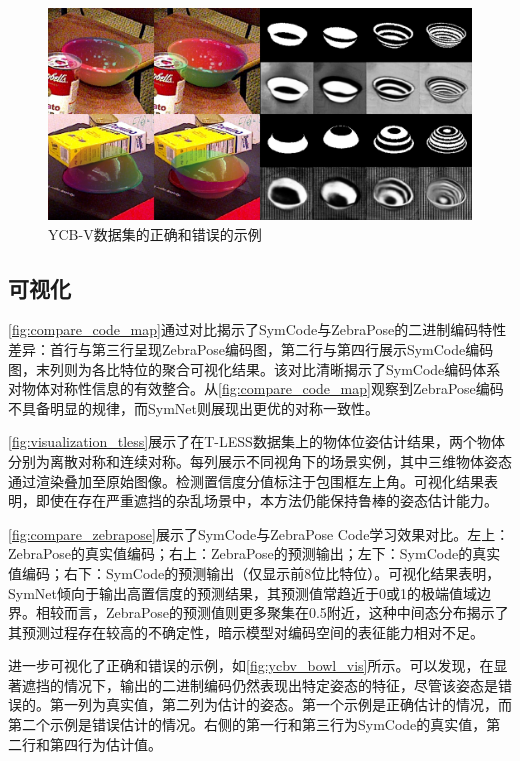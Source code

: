 \begin{figure}[h]
        \centerline{\includegraphics[width=1.0\textwidth]{figure/symnet/ycbv_bowl_vis.jpg}}
        \caption{YCB-V数据集的正确和错误的示例}
        \label{fig:ycbv_bowl_vis}
\end{figure}

\subsection{可视化} 

\autoref{fig:compare_code_map}通过对比揭示了SymCode与ZebraPose的二进制编码特性差异：首行与第三行呈现ZebraPose编码图，第二行与第四行展示SymCode编码图，末列则为各比特位的聚合可视化结果。该对比清晰揭示了SymCode编码体系对物体对称性信息的有效整合。从\autoref{fig:compare_code_map}观察到ZebraPose编码不具备明显的规律，而SymNet则展现出更优的对称一致性。

\autoref{fig:visualization_tless}展示了在T-LESS数据集上的物体位姿估计结果，两个物体分别为离散对称和连续对称。每列展示不同视角下的场景实例，其中三维物体姿态通过渲染叠加至原始图像。检测置信度分值标注于包围框左上角。可视化结果表明，即使在存在严重遮挡的杂乱场景中，本方法仍能保持鲁棒的姿态估计能力。

\autoref{fig:compare_zebrapose}展示了SymCode与ZebraPose Code学习效果对比。左上：ZebraPose的真实值编码；右上：ZebraPose的预测输出；左下：SymCode的真实值编码；右下：SymCode的预测输出（仅显示前8位比特位）。可视化结果表明，SymNet倾向于输出高置信度的预测结果，其预测值常趋近于0或1的极端值域边界。相较而言，ZebraPose的预测值则更多聚集在0.5附近，这种中间态分布揭示了其预测过程存在较高的不确定性，暗示模型对编码空间的表征能力相对不足。

进一步可视化了正确和错误的示例，如\autoref{fig:ycbv_bowl_vis}所示。可以发现，在显著遮挡的情况下，输出的二进制编码仍然表现出特定姿态的特征，尽管该姿态是错误的。第一列为真实值，第二列为估计的姿态。第一个示例是正确估计的情况，而第二个示例是错误估计的情况。右侧的第一行和第三行为SymCode的真实值，第二行和第四行为估计值。

